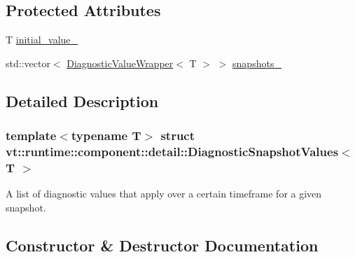 \subsection*{Protected Attributes}
\begin{DoxyCompactItemize}
\item 
T \hyperlink{structvt_1_1runtime_1_1component_1_1detail_1_1_diagnostic_snapshot_values_af4817919ef8c294ce8e3e45e2f3d914d}{initial\+\_\+value\+\_\+}
\item 
std\+::vector$<$ \hyperlink{structvt_1_1runtime_1_1component_1_1detail_1_1_diagnostic_value_wrapper}{Diagnostic\+Value\+Wrapper}$<$ T $>$ $>$ \hyperlink{structvt_1_1runtime_1_1component_1_1detail_1_1_diagnostic_snapshot_values_aa88c82ca31224456d8daf7efe44b60fb}{snapshots\+\_\+}
\end{DoxyCompactItemize}


\subsection{Detailed Description}
\subsubsection*{template$<$typename T$>$\newline
struct vt\+::runtime\+::component\+::detail\+::\+Diagnostic\+Snapshot\+Values$<$ T $>$}

A list of diagnostic values that apply over a certain timeframe for a given snapshot. 

\subsection{Constructor \& Destructor Documentation}
\mbox{\label{structvt_1_1runtime_1_1component_1_1detail_1_1_diagnostic_snapshot_values_aed694eb0b124fda6f746855e83965a95}} 
